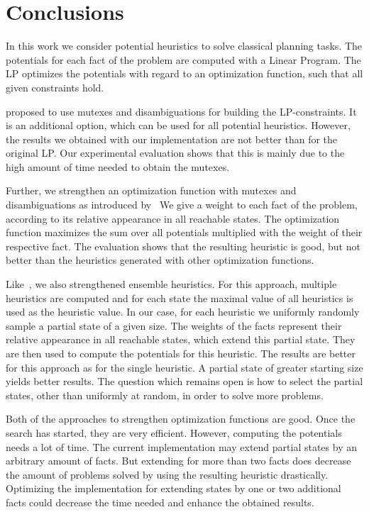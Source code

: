 \chapter{Conclusions}\label{ch:conclusions}
In this work we consider potential heuristics to solve classical planning tasks.
The potentials for each fact of the problem are computed with a Linear Program.
The LP optimizes the potentials with regard to an optimization function, such that all given constraints hold.

\cite{fivser2020strengthening} proposed to use mutexes and disambiguations for building the LP-constraints.
It is an additional option, which can be used for all potential heuristics.
However, the results we obtained with our implementation are not better than for the original LP.
Our experimental evaluation shows that this is mainly due to the high amount of time needed to obtain the mutexes.

Further, we strengthen an optimization function with mutexes and disambiguations as introduced by~\cite{fivser2020strengthening}
We give a weight to each fact of the problem, according to its relative appearance in all reachable states.
The optimization function maximizes the sum over all potentials multiplied with the weight of their respective fact.
The evaluation shows that the resulting heuristic is good, but not better than the heuristics generated with other optimization functions.

Like~\cite{fivser2020strengthening}, we also strengthened ensemble heuristics.
For this approach, multiple heuristics are computed and for each state the maximal value of all heuristics is used as the heuristic value.
In our case, for each heuristic we uniformly randomly sample a partial state of a given size.
The weights of the facts represent their relative appearance in all reachable states, which extend this partial state.
They are then used to compute the potentials for this heuristic.
The results are better for this approach as for the single heuristic.
A partial state of greater starting size yields better results.
The question which remains open is how to select the partial states, other than uniformly at random, in order to solve more problems.

Both of the approaches to strengthen optimization functions are good.
Once the search has started, they are very efficient.
However, computing the potentials needs a lot of time.
The current implementation may extend partial states by an arbitrary amount of facts.
But extending for more than two facts does decrease the amount of problems solved by using the resulting heuristic drastically.
Optimizing the implementation for extending states by one or two additional facts could decrease the time needed and enhance the obtained results.

